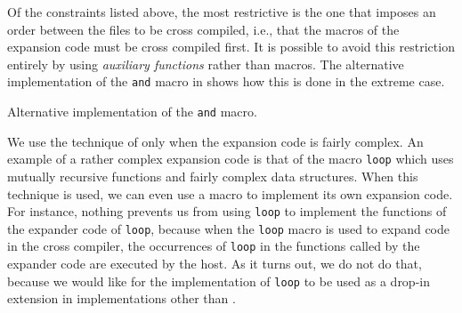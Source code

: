 Of the constraints listed above, the most restrictive is the one that
imposes an order between the files to be cross compiled, i.e., that
the macros of the expansion code must be cross compiled first.  It is
possible to avoid this restriction entirely by using \emph{auxiliary
  functions} rather than macros.  The alternative implementation of
the \texttt{and} macro in  shows how this
is done in the extreme case.

\begin{codefragment}
\caption{\label{code-defmacro-and-2}
Alternative implementation of the \texttt{and} macro.}
\end{codefragment}

We use the technique of  only when the
expansion code is fairly complex.  An example of a rather complex
expansion code is that of the macro \texttt{loop} which uses mutually
recursive functions and fairly complex data structures.  When this
technique is used, we can even use a macro to implement its own
expansion code.  For instance, nothing prevents us from using
\texttt{loop} to implement the functions of the expander code of
\texttt{loop}, because when the \texttt{loop} macro is used to expand
code in the cross compiler, the occurrences of \texttt{loop} in the
functions called by the expander code are executed by the host.  As it
turns out, we do not do that, because we would like for the \sysname{}
implementation of \texttt{loop} to be used as a drop-in extension in
implementations other than \sysname{}.


